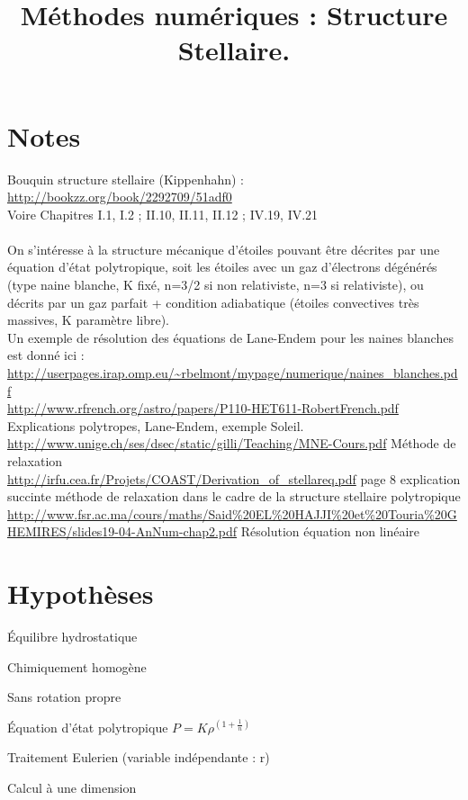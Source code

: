 \documentclass[a4paper,10pt]{article}
\begin{document}
\title{Méthodes numériques : Structure Stellaire.}
\maketitle
\tableofcontents

\newpage

\section*{Notes}
Bouquin structure stellaire (Kippenhahn) :\\
\url{http://bookzz.org/book/2292709/51adf0}\\
Voire Chapitres I.1, I.2 ; II.10, II.11, II.12 ; IV.19, IV.21\\
\\
On s'intéresse à la structure mécanique d'étoiles pouvant être décrites par une équation d'état polytropique, soit les étoiles avec un gaz d'électrons dégénérés (type naine blanche, K fixé, n=3/2 si non relativiste, n=3 si relativiste), ou décrits par un gaz parfait + condition adiabatique (étoiles convectives très massives, K paramètre libre).\\
Un exemple de résolution des équations de Lane-Endem pour les naines blanches est donné ici : \url{http://userpages.irap.omp.eu/~rbelmont/mypage/numerique/naines_blanches.pdf}\\
\url{http://www.rfrench.org/astro/papers/P110-HET611-RobertFrench.pdf} Explications polytropes, Lane-Endem, exemple Soleil.\\
\url{http://www.unige.ch/ses/dsec/static/gilli/Teaching/MNE-Cours.pdf} Méthode de relaxation \\
\url{http://irfu.cea.fr/Projets/COAST/Derivation_of_stellareq.pdf} page 8 explication succinte méthode de relaxation dans le cadre de la structure stellaire polytropique\\
\url{http://www.fsr.ac.ma/cours/maths/Said%20EL%20HAJJI%20et%20Touria%20GHEMIRES/slides19-04-AnNum-chap2.pdf} Résolution équation non linéaire\\



\section{Hypothèses}
\begin{list}{•}{}
\item Équilibre hydrostatique
\item Chimiquement homogène
\item Sans rotation propre
\item Équation d'état polytropique $ P = K \rho^{(1+\frac{1}{n})} $
\item Traitement Eulerien (variable indépendante : r)
\item Calcul à une dimension
\end{list}
\end{document}
